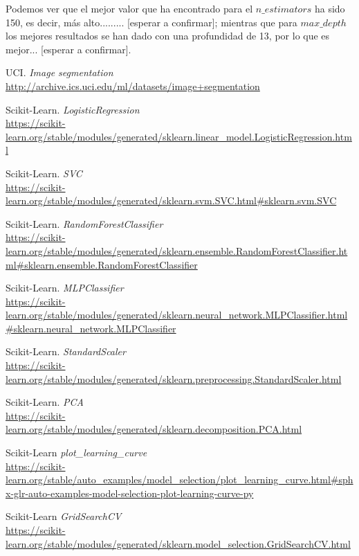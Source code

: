 \documentclass[11pt,a4paper]{article}
\begin{document}
Podemos ver que el mejor valor que ha encontrado para el $n\_estimators$ ha sido 150, es decir, más alto......... [esperar a confirmar]; mientras que para $max\_depth$ los mejores resultados se han dado con una profundidad de 13, por lo que es mejor... [esperar a confirmar].


\newpage

\begin{thebibliography}{20}

UCI. \textit{Image segmentation}
\\\url{http://archive.ics.uci.edu/ml/datasets/image+segmentation}

Scikit-Learn. \textit{LogisticRegression}
\\\url{https://scikit-learn.org/stable/modules/generated/sklearn.linear_model.LogisticRegression.html}

Scikit-Learn. \textit{SVC}
\\\url{https://scikit-learn.org/stable/modules/generated/sklearn.svm.SVC.html#sklearn.svm.SVC}

Scikit-Learn. \textit{RandomForestClassifier}
\\\url{https://scikit-learn.org/stable/modules/generated/sklearn.ensemble.RandomForestClassifier.html#sklearn.ensemble.RandomForestClassifier}

Scikit-Learn. \textit{MLPClassifier}
\\\url{https://scikit-learn.org/stable/modules/generated/sklearn.neural_network.MLPClassifier.html#sklearn.neural_network.MLPClassifier}

Scikit-Learn. \textit{StandardScaler}
\\\url{https://scikit-learn.org/stable/modules/generated/sklearn.preprocessing.StandardScaler.html}

Scikit-Learn. \textit{PCA}
\\\url{https://scikit-learn.org/stable/modules/generated/sklearn.decomposition.PCA.html}

Scikit-Learn \textit{plot\_learning\_curve}
\\\url{https://scikit-learn.org/stable/auto_examples/model_selection/plot_learning_curve.html#sphx-glr-auto-examples-model-selection-plot-learning-curve-py}

Scikit-Learn \textit{GridSearchCV}
\\\url{https://scikit-learn.org/stable/modules/generated/sklearn.model_selection.GridSearchCV.html}

\end{thebibliography}
\end{document}
